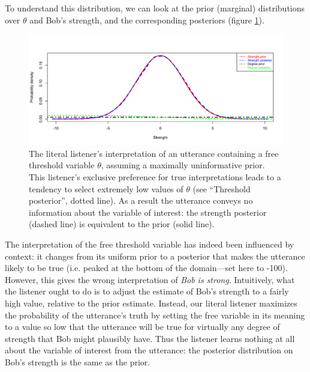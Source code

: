 \documentclass[pdfextras]{handbook}
\begin{document}

To understand this distribution, we can look at 
the prior (marginal) distributions over $\theta$ and Bob's strength, and the corresponding posteriors (figure \ref{strong-L0}).
%
\begin{figure}[tbh]
\begin{center} 
\includegraphics[scale=.45]{strong-L0.pdf}
\end{center}
\label{strong-L0}
\caption{The literal listener's interpretation of an utterance containing a free threshold variable $\theta$, assuming a maximally uninformative prior. 
This listener's exclusive preference for true interpretations leads to a tendency to select extremely low values of $\theta$ (see ``Threshold posterior'', dotted line). As a result the utterance conveys no information about the variable of interest: the strength posterior (dashed line) is equivalent to the prior (solid line).}
\end{figure}
%
The interpretation of the free threshold variable has indeed been influenced by context: it changes from its uniform prior to a posterior that makes the utterance likely to be true (i.e. peaked at the bottom of the domain---set here to -100). 
However, this gives the wrong interpretation of \emph{Bob is strong}. Intuitively, what the listener ought to do is to adjust the estimate of Bob's strength to a fairly high value, relative to the prior estimate. 
Instead, our literal listener maximizes the probability of the utterance's truth by setting the free variable in its meaning to a value so low that the utterance will be true for virtually any degree of strength that Bob might plausibly have. 
Thus the listener learns nothing at all about the variable of interest from the utterance: the posterior distribution on Bob's strength is the same as the prior.
\end{document}

